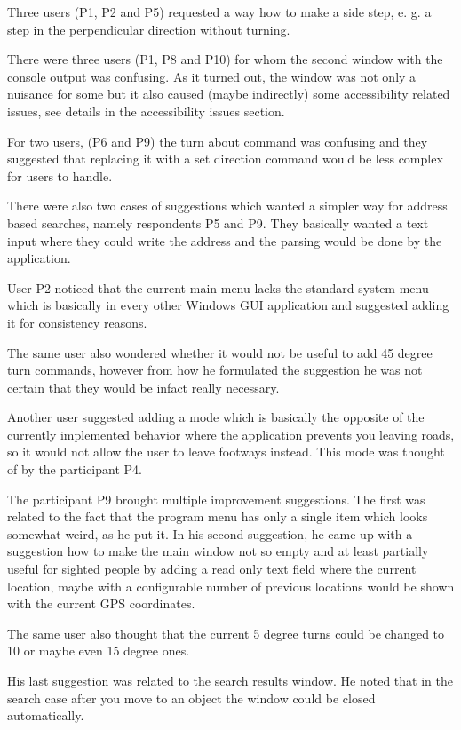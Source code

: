 \documentclass[nolof,digital]{fithesis3}
\begin{document}
Three users (P1, P2 and P5) requested a way how to make a side step, e. g. a step in the perpendicular direction without turning.

There were three users (P1, P8 and P10) for whom the second window with the console output was confusing. As it turned out, the window was not only a nuisance for some but it also caused (maybe indirectly) some accessibility related issues, see details in the accessibility issues section.

For two users, (P6 and P9) the turn about command was confusing and they suggested that replacing it with a set direction command would be less complex for users to handle.

There were also two cases of suggestions which wanted a simpler way for address based searches, namely respondents P5 and P9. They basically wanted a text input where they could write the address and the parsing would be done by the application.

User P2 noticed that the current main menu lacks the standard system menu which is basically in every other Windows GUI application and suggested adding it for consistency reasons.

The same user also wondered whether it would not be useful to add 45 degree turn commands, however from how he formulated the suggestion he was not certain that they would be infact really necessary.

Another user suggested adding a mode which is basically the opposite of the currently implemented behavior where the application prevents you leaving roads, so it would not allow the user to leave footways instead. This mode was thought of by the participant P4.

The participant P9 brought multiple improvement suggestions. The first was related to the fact that the program menu has only a single item which looks somewhat weird, as he put it. In his second suggestion, he came up with a suggestion how to make the main window not so empty and at least partially useful for sighted people by adding a read only text field where the current location, maybe with a configurable number of previous locations would be shown with the current GPS coordinates.

The same user also thought that the current 5 degree turns could be changed to 10 or maybe even 15 degree ones.

His last suggestion was related to the search results window. He noted that in the search case after you move to an object the window could be closed automatically.
\end{document}
